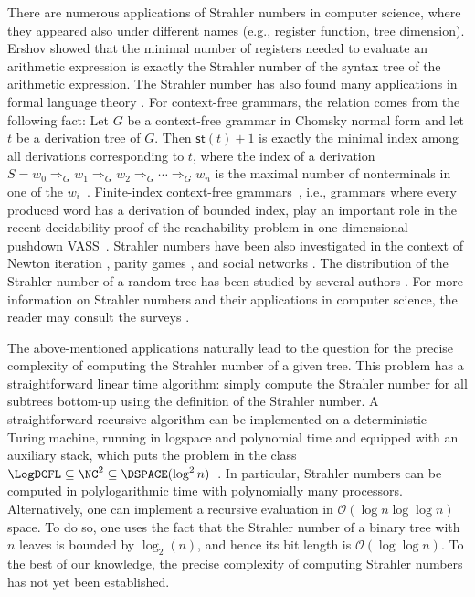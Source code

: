 \documentclass[a4paper,UKenglish,cleveref, autoref, thm-restate, numberwithinsect]{lipics-v2021}
\newcommand{\derive}{\Rightarrow}
\newcommand{\hs}{\mathsf{st}}
\begin{document}
There are numerous applications of Strahler numbers in computer science, where they appeared also under different names (e.g., register function, tree dimension).
Ershov \cite{Ers58} showed that the minimal number of registers needed to evaluate an arithmetic expression is exactly the Strahler number of the 
syntax tree of the arithmetic expression. The Strahler number has also found many applications in formal language theory \cite{ChMo90,EhRoVe81,GiSpa68,SOS23}. For context-free grammars, the relation comes from the following fact: Let $G$ be a context-free grammar in Chomsky normal form and let $t$ be a derivation tree of $G$.
Then $\hs(t)+1$ is exactly the minimal index among all derivations corresponding to $t$,
where the index of a derivation $S = w_0 \derive_G w_1 \derive_G w_2 \derive_G \cdots \derive_G w_n$ 
 is the maximal number of nonterminals in one of the $w_i$~\cite{GiSpa68}. 
Finite-index context-free grammars~\cite{AtigG11}, i.e., grammars where every produced word has a derivation of bounded index,
play an important role in the recent decidability proof of the reachability problem in one-dimensional pushdown VASS~\cite{BiziereC25}.
Strahler numbers have been also investigated in the context of Newton iteration \cite{EKL10,PiSaSo12}, parity games \cite{DaJuTh20}, and 
social networks \cite{ADDGG04}.
The distribution of the  Strahler number of a random tree has been studied by several authors \cite{DevKru95,DeKru96,FRV79,Kemp79,Kru99}.
For more information on Strahler numbers and their applications in computer science, the reader may consult
the surveys \cite{EsparzaLS14,Vie90}.

The above-mentioned applications naturally lead to the question for the precise complexity of computing the Strahler number
of a given tree. This problem has a straightforward linear time algorithm: simply compute the Strahler number for all subtrees
bottom-up using the definition of the Strahler number.
A straightforward recursive algorithm can be implemented on a deterministic Turing machine, running in logspace and polynomial time and equipped with an auxiliary stack,
which puts the problem in the class $\LogDCFL \subseteq \NC^2 \subseteq \DSPACE(\log^2 n)$~\cite{Sudborough78}. In particular, Strahler numbers can be computed in polylogarithmic time with polynomially many processors.
Alternatively, one can implement a recursive evaluation in $\mathcal{O}(\log n \log \log n)$ space.
To do so, one uses the fact that the Strahler number of a binary tree with $n$ leaves is bounded by $\log_2(n)$,
and hence its bit length is $\mathcal{O}(\log \log n)$.
To the best of our knowledge, the precise complexity of computing Strahler numbers has not yet been established.
\end{document}
